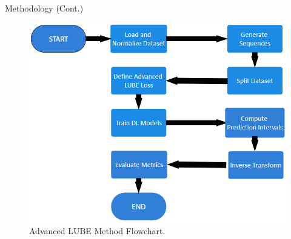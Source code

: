 \documentclass[xcolor=dvipsnames,aspectratio=169]{beamer}
\begin{document}
\begin{frame}{Methodology (Cont.)}
\begin{figure}
    \centering
    \includegraphics[width=0.5\linewidth]{ALUBE.png}
    \caption{Advanced LUBE Method Flowchart.}
    \label{fig:enter-label}
\end{figure}
\end{frame}
\end{document}
